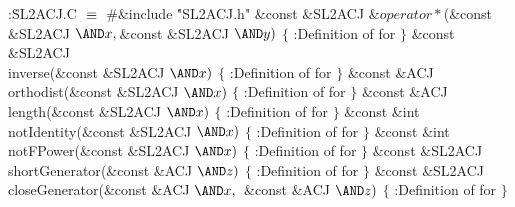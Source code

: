 \B{}:\.{SL2ACJ.C }\X${}\equiv{}$\6
\8\#\&{include} \.{"SL2ACJ.h"}\6
\&{const} \&{SL2ACJ} ${}\&{operator}*{}$(\&{const} \&{SL2ACJ} ${}{\AND}\|x,%
\39{}$\&{const} \&{SL2ACJ} ${}{\AND}\|y){}$\1\1\2\2\6
${}\{{}$\1\6
:Definition of  for \X\6
\4${}\}{}$\2\7
\&{const} \&{SL2ACJ} \\{inverse}(\&{const} \&{SL2ACJ} ${}{\AND}\|x){}$\1\1\2\2\6
${}\{{}$\1\6
:Definition of  for \X\6
\4${}\}{}$\2\7
\&{const} \&{ACJ} \\{orthodist}(\&{const} \&{SL2ACJ} ${}{\AND}\|x){}$\1\1\2\2\6
${}\{{}$\1\6
:Definition of  for \X\6
\4${}\}{}$\2\7
\&{const} \&{ACJ} \\{length}(\&{const} \&{SL2ACJ} ${}{\AND}\|x){}$\1\1\2\2\6
${}\{{}$\1\6
:Definition of  for \X\6
\4${}\}{}$\2\7
\&{const} \&{int} \\{notIdentity}(\&{const} \&{SL2ACJ} ${}{\AND}\|x){}$\1\1\2\2%
\6
${}\{{}$\1\6
:Definition of  for \X\6
\4${}\}{}$\2\7
\&{const} \&{int} \\{notFPower}(\&{const} \&{SL2ACJ} ${}{\AND}\|x){}$\1\1\2\2\6
${}\{{}$\1\6
:Definition of  for \X\6
\4${}\}{}$\2\7
\&{const} \&{SL2ACJ} \\{shortGenerator}(\&{const} \&{ACJ} ${}{\AND}\|z){}$\1\1%
\2\2\6
${}\{{}$\1\6
:Definition of  for \X\6
\4${}\}{}$\2\7
\&{const} \&{SL2ACJ} \\{closeGenerator}(\&{const} \&{ACJ} ${}{\AND}\|x,\39{}$%
\&{const} \&{ACJ} ${}{\AND}\|z){}$\1\1\2\2\6
${}\{{}$\1\6
:Definition of  for \X\6
\4${}\}{}$\2\par
\fi

